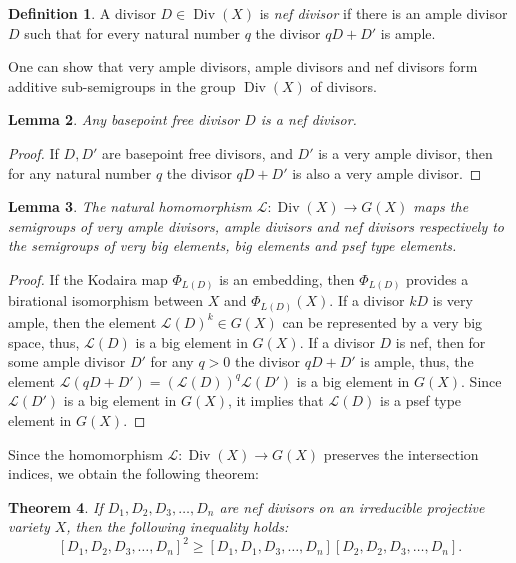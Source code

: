 \documentclass[11pt]{article}
\theoremstyle{plain}
\newtheorem{theorem}{Theorem}[section]
\newtheorem{lemma}[theorem]{Lemma}
\theoremstyle{definition}
\newtheorem{definition}[theorem]{Definition}
\newcommand\Div{\operatorname{Div}}
\begin{document}
\begin{definition} A divisor  $D\in \Div(X)$   is
  {\it  nef divisor} if there is an ample divisor $D$  such that  for every natural number $q$ the divisor  $qD + D'$ is  ample.
    \end{definition}

One can show that very ample divisors, ample divisors  and  nef divisors form  additive sub-semigroups in the group $\Div(X)$ of  divisors.

 \begin{lemma} Any basepoint free  divisor  $D$ is a nef divisor.
 \end{lemma}

\begin{proof} If  $D,D'$  are basepoint free  divisors, and  $D'$ is a very ample divisor, then  for any natural number $q$ the divisor  $qD+D'$  is also  a very ample divisor.
\end{proof}


\begin{lemma} The natural homomorphism  $\mathcal L:\Div(X)\to G(X)$ maps  the semigroups of  very ample divisors,  ample divisors and nef divisors  respectively to the semigroups of  very big  elements,  big elements and  psef type elements.
\end{lemma}

\begin{proof} If the Kodaira  map $\Phi_{L(D)}$ is an embedding, then $\Phi_{L(D)}$ provides a birational isomorphism between $X$ and $\Phi_{L(D)} (X)$.
If a divisor $k D$ is very ample, then the element $\mathcal L(D)^k\in G(X)$ can be represented by a very big space, thus, $\mathcal L(D)$ is a big element in $G(X)$. If a divisor $D$ is nef, then for some ample divisor $D'$  for any $q>0$ the divisor $qD+D'$ is ample, thus, the element $\mathcal L(qD+D')=(\mathcal L(D))^q \mathcal L(D')$ is a big element in $G(X)$. Since $\mathcal L( D')$ is a big element in $G(X)$, it implies that $\mathcal L (D)$ is a psef type element in $G(X)$.
\end{proof}

Since the homomorphism $\mathcal L:\Div(X)\to G(X)$ preserves the intersection indices, we obtain the following theorem:

\begin{theorem}\label{KhT-1} If $ D_1, D_2,  D_3,\dots,  D_n$ are
nef  divisors on an irreducible projective variety $X$,  then the following inequality holds:
\begin{equation}\label{divAF}
[D_1, D_2, D_3,\dots, D_n]^2 \geq [D_1, D_1,  D_3, \dots, D_n] [D_2, D_2,   D_3, \dots, D_n].
\end{equation}
\end{theorem}
\end{document}
